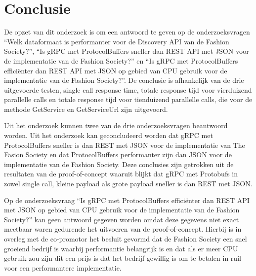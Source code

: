 
\chapter{Conclusie}
\label{ch:conclusie}


De opzet van dit onderzoek is om een antwoord te geven op de onderzoeksvragen “Welk dataformaat is performanter voor de Discovery API van de Fashion Society?”, “Is gRPC met ProtocolBuffers sneller dan REST API met JSON voor de implementatie van de Fashion Society?” en “Is gRPC met ProtocolBuffers efficiënter dan REST API met JSON op gebied van CPU gebruik voor de implementatie van de Fashion Society?”.
De conclusie is afhankelijk van de drie uitgevoerde testen, single call response time, totale response tijd voor vierduizend parallelle calls en totale response tijd voor tienduizend parallelle calls, die voor de methode GetService en GetServiceUrl zijn uitgevoerd.

Uit het onderzoek kunnen twee van de drie onderzoeksvragen beantwoord worden. Uit het onderzoek kan geconcludeerd worden dat gRPC met ProtocolBuffers sneller is dan REST met JSON voor de implementatie van The Fasion Society en dat ProtocolBuffers performanter zijn dan JSON voor de implementatie van de Fashion Society. Deze conclusies zijn getrokken uit de resultaten van de proof-of-concept waaruit blijkt dat gRPC met Protobufs in zowel single call, kleine payload als grote payload sneller is dan REST met JSON.

Op de onderzoeksvraag “Is gRPC met ProtocolBuffers efficiënter dan REST API met JSON op gebied van CPU gebruik voor de implementatie van de Fashion Society?” kan geen antwoord gegeven worden omdat deze gegevens niet exact meetbaar waren gedurende het uitvoeren van de proof-of-concept. Hierbij is in overleg met de co-promotor het besluit gevormd dat de Fashion Society een snel groeiend bedrijf is waarbij performantie belangrijk is en dat als er meer CPU gebruik zou zijn dit een prijs is dat het bedrijf gewillig is om te betalen in ruil voor een performantere implementatie.

